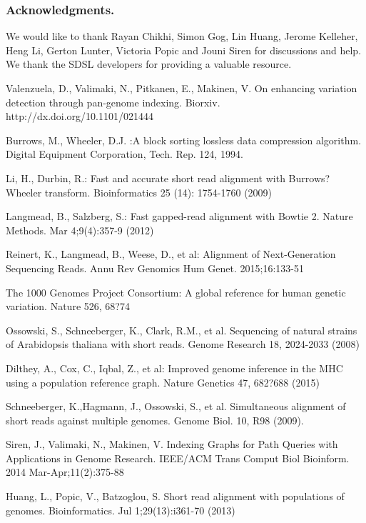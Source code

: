 \documentclass[runningheads,a4paper]{llncs}
\begin{document}
\subsubsection*{Acknowledgments.} We would like to thank Rayan Chikhi, Simon Gog, Lin Huang, Jerome Kelleher, Heng Li,  Gerton Lunter, Victoria Popic and Jouni Siren for discussions and help. We thank the SDSL developers for providing a valuable  resource.



\begin{thebibliography}{4}

 Valenzuela, D., Valimaki, N., Pitkanen, E., Makinen, V. On enhancing variation detection through pan-genome indexing. Biorxiv. http://dx.doi.org/10.1101/021444

 Burrows, M., Wheeler, D.J. :A block sorting lossless data compression algorithm. Digital Equipment Corporation, Tech. Rep. 124, 1994. 

 Li, H., Durbin, R.: Fast and accurate short read alignment with Burrows?Wheeler transform. Bioinformatics 25 (14): 1754-1760 (2009)

 Langmead, B., Salzberg, S.: Fast gapped-read alignment with Bowtie 2. Nature Methods. Mar 4;9(4):357-9 (2012)

 Reinert, K., Langmead, B., Weese, D., et al: Alignment of Next-Generation Sequencing Reads. Annu Rev Genomics Hum Genet. 2015;16:133-51

 The 1000 Genomes Project Consortium: A global reference for human genetic variation. Nature 526, 68?74

 Ossowski, S., Schneeberger, K., Clark, R.M., et al. Sequencing of natural strains of Arabidopsis thaliana with short reads. Genome Research 18, 2024-2033 (2008)

 Dilthey, A., Cox, C., Iqbal, Z., et al: Improved genome inference in the MHC using a population reference graph. Nature Genetics 47, 682?688 (2015)

 Schneeberger, K.,Hagmann, J., Ossowski, S.,  et al. Simultaneous alignment of short reads against multiple genomes. Genome Biol. 10, R98 (2009).

 Siren, J., Valimaki, N., Makinen, V. Indexing Graphs for Path Queries with Applications in Genome Research. IEEE/ACM Trans Comput Biol Bioinform. 2014 Mar-Apr;11(2):375-88

 Huang, L., Popic, V., Batzoglou, S. Short read alignment with populations of genomes. Bioinformatics. Jul 1;29(13):i361-70 (2013)


\end{thebibliography}
\end{document}
